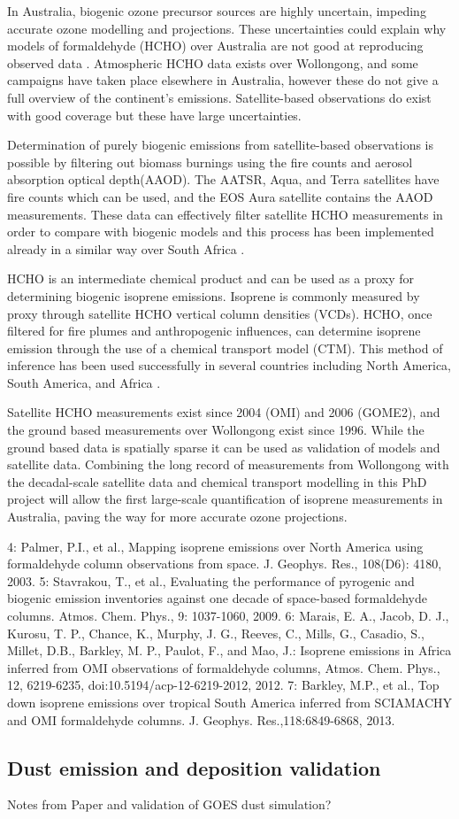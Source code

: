 In Australia, biogenic ozone precursor sources are highly uncertain, impeding accurate ozone modelling and projections. These uncertainties could explain why models of formaldehyde (HCHO) over Australia are not good at reproducing observed data \cite{Stavrakou_2009}. Atmospheric HCHO data exists over Wollongong, and some campaigns have taken place elsewhere in Australia, however these do not give a full overview of the continent's emissions. Satellite-based observations do exist with good coverage but these have large uncertainties. 

Determination of purely biogenic emissions from satellite-based observations is possible by filtering out biomass burnings using the fire counts and aerosol absorption optical depth(AAOD). The AATSR, Aqua, and Terra satellites have fire counts which can be used, and the EOS Aura satellite contains the AAOD measurements. These data can effectively filter satellite HCHO measurements in order to compare with biogenic models and this process has been implemented already in a similar way over South Africa \cite{Marais_2012}.

HCHO is an intermediate chemical product and can be used as a proxy for determining biogenic isoprene emissions. 
Isoprene is commonly measured by proxy through satellite HCHO vertical column densities (VCDs). HCHO, once filtered for fire plumes and anthropogenic influences, can determine isoprene emission through the use of a chemical transport model (CTM).
This method of inference has been used successfully in several countries including North America\cite{Palmer_2003}, South America\cite{Barkley_2013}, and Africa \cite{Marais_2012}.

Satellite HCHO measurements exist since 2004 (OMI) and 2006 (GOME2), and the ground based measurements over Wollongong exist since 1996. While the ground based data is spatially sparse it can be used as validation of models and satellite data. Combining the long record of measurements from Wollongong with the decadal-scale satellite data and chemical transport modelling in this PhD project will allow the first large-scale quantification of isoprene measurements in Australia, paving the way for more accurate ozone projections.

4: Palmer, P.I., et al., Mapping isoprene emissions over North America using formaldehyde column observations from space. J. Geophys.
Res., 108(D6): 4180, 2003.
5: Stavrakou, T., et al., Evaluating the performance of pyrogenic and biogenic emission inventories against one decade of space-based formaldehyde columns. Atmos. Chem. Phys., 9: 1037-1060, 2009.
6: Marais, E. A., Jacob, D. J., Kurosu, T. P., Chance, K., Murphy, J. G., Reeves, C., Mills, G., Casadio, S., Millet, D.B., Barkley, M. P., Paulot, F., and Mao, J.: Isoprene emissions in Africa inferred from OMI observations of formaldehyde columns, Atmos. Chem. Phys., 12, 6219-6235, doi:10.5194/acp-12-6219-2012, 2012.
7: Barkley, M.P., et al., Top down isoprene emissions over tropical South America inferred from SCIAMACHY and OMI formaldehyde columns. J. Geophys. Res.,118:6849-6868, 2013.

\subsection{Dust emission and deposition validation}
Notes from Paper and validation of GOES dust simulation?
  
  
  
  